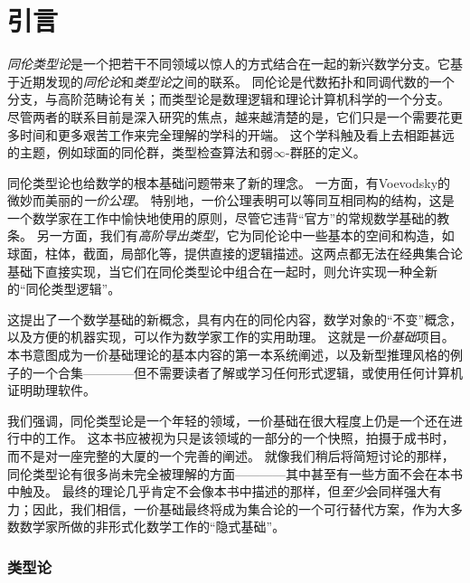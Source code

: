\chapter*{引言}
\setcounter{page}{1}


\emph{同伦类型论}是一个把若干不同领域以惊人的方式结合在一起的新兴数学分支。它基于近期发现的\emph{同伦论}和\emph{类型论}之间的联系。
同伦论是代数拓扑和同调代数的一个分支，与高阶范畴论有关；而类型论是数理逻辑和理论计算机科学的一个分支。
尽管两者的联系目前是深入研究的焦点，越来越清楚的是，它们只是一个需要花更多时间和更多艰苦工作来完全理解的学科的开端。
这个学科触及看上去相距甚远的主题，例如球面的同伦群，类型检查算法和弱$\infty$-群胚的定义。

同伦类型论也给数学的根本基础问题带来了新的理念。
%
一方面，有Voevodsky的微妙而美丽的\emph{一价公理}。 
%
特别地，一价公理表明可以等同互相同构的结构，这是一个数学家在工作中愉快地使用的原则，尽管它违背“官方”的常规数学基础的教条。
另一方面，我们有\emph{高阶导出类型}，它为同伦论中一些基本的空间和构造，如球面，柱体，截面，局部化等，提供直接的逻辑描述。这两点都无法在经典集合论基础下直接实现，当它们在同伦类型论中组合在一起时，则允许实现一种全新的“同伦类型逻辑”。
%

这提出了一个数学基础的新概念，具有内在的同伦内容，数学对象的“不变”概念，以及方便的机器实现，可以作为数学家工作的实用助理。
这就是\emph{一价基础}项目。本书意图成为一价基础理论的基本内容的第一本系统阐述，以及新型推理风格的例子的一个合集————但不需要读者了解或学习任何形式逻辑，或使用任何计算机证明助理软件。

\OPTwidow

我们强调，同伦类型论是一个年轻的领域，一价基础在很大程度上仍是一个还在进行中的工作。
这本书应被视为只是该领域的一部分的一个快照，拍摄于成书时，而不是对一座完整的大厦的一个完善的阐述。
就像我们稍后将简短讨论的那样，同伦类型论有很多尚未完全被理解的方面————其中甚至有一些方面不会在本书中触及。
最终的理论几乎肯定不会像本书中描述的那样，但\emph{至少}会同样强大有力；因此，我们相信，一价基础最终将成为集合论的一个可行替代方案，作为大多数数学家所做的非形式化数学工作的“隐式基础”。

\subsection*{类型论}

